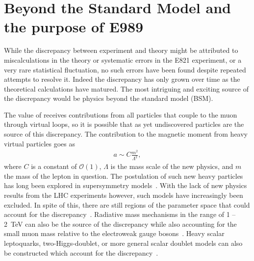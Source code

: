 \section{Beyond the Standard Model and the purpose of E989}
\label{sec:BSM}


While the discrepancy between experiment and theory might be attributed to miscalculations in the theory or systematic errors in the E821 experiment, or a very rare statistical fluctuation, no such errors have been found despite repeated attempts to resolve it. Indeed the discrepancy has only grown over time as the theoretical calculations have matured. The most intriguing and exciting source of the discrepancy would be physics beyond the standard model (BSM). 


The value of \amu receives contributions from all particles that couple to the muon through virtual loops, so it is possible that as yet undiscovered particles are the source of this discrepancy. The contribution to the magnetic moment from heavy virtual particles goes as 
		\begin{align}
            a \sim C \frac{m^{2}}{\Lambda^{2}},
		\end{align}
where $C$ is a constant of $\mathcal{O}(1)$, $\Lambda$ is the mass scale of the new physics, and $m$ the mass of the lepton in question. The postulation of such new heavy particles has long been explored in supersymmetry models~\cite{Czarnecki_2001}. With the lack of new physics results from the LHC experiments however, such models have increasingly been excluded. In spite of this, there are still regions of the parameter space that could account for the \gmtwo discrepancy~\cite{Hagiwara_2018}. Radiative mass mechanisms in the range of 1 -- \SI{2}{\TeV} can also be the source of the discrepancy while also accounting for the small muon mass relative to the electroweak gauge bosons~\cite{Czarnecki_2001}. Heavy scalar leptoquarks, two-Higgs-doublet, or more general scalar doublet models can also be constructed which account for the discrepancy~\cite{Leskow_2017,crivellin2019bto,Abe_2019}.




